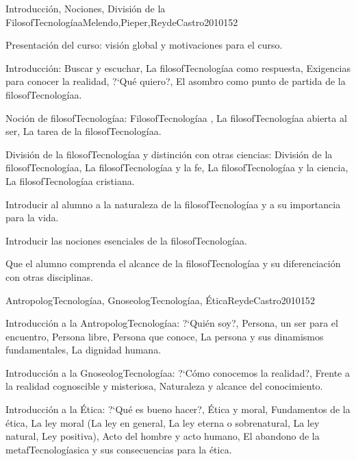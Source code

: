 \begin{syllabus}
\begin{unit}{Introducción, Nociones, División de la FilosofTecnologíaa}{Melendo,Pieper,ReydeCastro2010}{15}{2}
\begin{topics}
	\item Presentación del curso: visión global y motivaciones para el curso.
	\item Introducción: Buscar y escuchar, La filosofTecnologíaa como respuesta, Exigencias para conocer la realidad, ?`Qué quiero?, El asombro como punto de partida de la filosofTecnologíaa.
	\item Noción de filosofTecnologíaa:  FilosofTecnologíaa , La filosofTecnologíaa abierta al ser, La tarea de la filosofTecnologíaa.
	\item División de la filosofTecnologíaa y distinción con otras ciencias: División de la filosofTecnologíaa, La filosofTecnologíaa y la fe, La filosofTecnologíaa y la ciencia,  La filosofTecnologíaa cristiana.
\end{topics}
\begin{unitgoals}
	\item Introducir al alumno a la naturaleza de la filosofTecnologíaa y a su importancia para la vida.
	\item Introducir las nociones esenciales de la filosofTecnologíaa.
	\item Que el alumno comprenda el alcance de la filosofTecnologíaa y su diferenciación con otras disciplinas.
\end{unitgoals}
\end{unit}

\begin{unit}{AntropologTecnologíaa, GnoseologTecnologíaa, Ética}{ReydeCastro2010}{15}{2}
\begin{topics}
	\item Introducción a la AntropologTecnologíaa: ?`Quién soy?, Persona, un ser para el encuentro, Persona libre, Persona que conoce, La persona y sus dinamismos fundamentales, La dignidad humana.
	\item Introducción a la GnoseologTecnologíaa: ?`Cómo conocemos la realidad?, Frente a la realidad cognoscible y misteriosa, Naturaleza y alcance del conocimiento.
	\item Introducción a la Ética: ?`Qué es bueno hacer?, Ética y moral, Fundamentos de la ética, La ley moral (La ley en general, La ley eterna o sobrenatural, La ley natural, Ley positiva), Acto del hombre y acto humano, El abandono de la metafTecnologíasica y sus consecuencias para la ética.
\end{topics}


\end{unit}
\end{syllabus}
